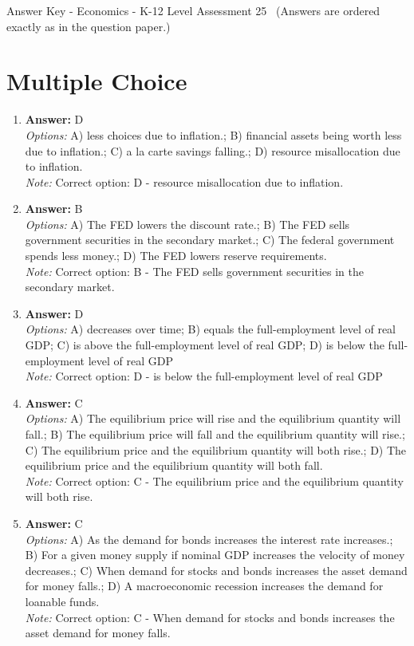 \documentclass[12pt]{article}
\begin{document}
\begin{center}
Answer Key - Economics - K-12 Level Assessment 25 \
\small (Answers are ordered exactly as in the question paper.)
\end{center}

\section*{Multiple Choice}
\begin{enumerate}[label=\arabic*.]
\item \textbf{Answer:} D
\\ \textit{Options:} A) less choices due to inflation.; B) financial assets being worth less due to inflation.; C) a la carte savings falling.; D) resource misallocation due to inflation.
\\ \textit{Note:} Correct option: D - resource misallocation due to inflation.
\item \textbf{Answer:} B
\\ \textit{Options:} A) The FED lowers the discount rate.; B) The FED sells government securities in the secondary market.; C) The federal government spends less money.; D) The FED lowers reserve requirements.
\\ \textit{Note:} Correct option: B - The FED sells government securities in the secondary market.
\item \textbf{Answer:} D
\\ \textit{Options:} A) decreases over time; B) equals the full-employment level of real GDP; C) is above the full-employment level of real GDP; D) is below the full-employment level of real GDP
\\ \textit{Note:} Correct option: D - is below the full-employment level of real GDP
\item \textbf{Answer:} C
\\ \textit{Options:} A) The equilibrium price will rise and the equilibrium quantity will fall.; B) The equilibrium price will fall and the equilibrium quantity will rise.; C) The equilibrium price and the equilibrium quantity will both rise.; D) The equilibrium price and the equilibrium quantity will both fall.
\\ \textit{Note:} Correct option: C - The equilibrium price and the equilibrium quantity will both rise.
\item \textbf{Answer:} C
\\ \textit{Options:} A) As the demand for bonds increases the interest rate increases.; B) For a given money supply if nominal GDP increases the velocity of money decreases.; C) When demand for stocks and bonds increases the asset demand for money falls.; D) A macroeconomic recession increases the demand for loanable funds.
\\ \textit{Note:} Correct option: C - When demand for stocks and bonds increases the asset demand for money falls.
\end{enumerate}
\end{document}
